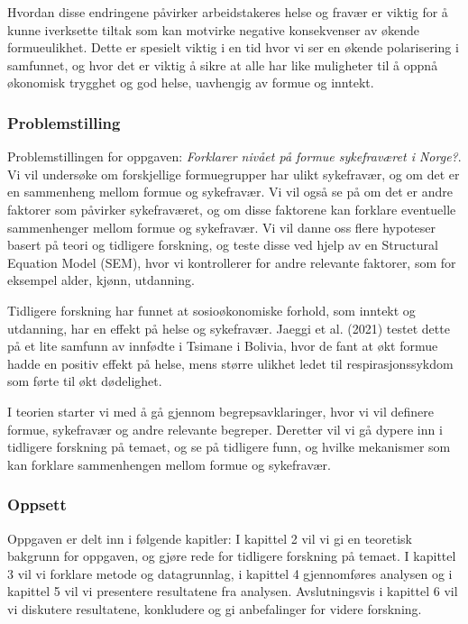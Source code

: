 \documentclass[
  12pt,
  a4paper,
  DIV=11,
  numbers=noendperiod]{scrartcl}
\begin{document}
Hvordan disse endringene påvirker arbeidstakeres helse og fravær er
viktig for å kunne iverksette tiltak som kan motvirke negative
konsekvenser av økende formueulikhet. Dette er spesielt viktig i en tid
hvor vi ser en økende polarisering i samfunnet, og hvor det er viktig å
sikre at alle har like muligheter til å oppnå økonomisk trygghet og god
helse, uavhengig av formue og inntekt.

\subsubsection{Problemstilling}\label{problemstilling}

Problemstillingen for oppgaven: \emph{Forklarer nivået på formue
sykefraværet i Norge?}. Vi vil undersøke om forskjellige formuegrupper
har ulikt sykefravær, og om det er en sammenheng mellom formue og
sykefravær. Vi vil også se på om det er andre faktorer som påvirker
sykefraværet, og om disse faktorene kan forklare eventuelle sammenhenger
mellom formue og sykefravær. Vi vil danne oss flere hypoteser basert på
teori og tidligere forskning, og teste disse ved hjelp av en Structural
Equation Model (SEM), hvor vi kontrollerer for andre relevante faktorer,
som for eksempel alder, kjønn, utdanning.

Tidligere forskning har funnet at sosioøkonomiske forhold, som inntekt
og utdanning, har en effekt på helse og sykefravær. Jaeggi et al. (2021)
testet dette på et lite samfunn av innfødte i Tsimane i Bolivia, hvor de
fant at økt formue hadde en positiv effekt på helse, mens større ulikhet
ledet til respirasjonssykdom som førte til økt dødelighet.

I teorien starter vi med å gå gjennom begrepsavklaringer, hvor vi vil
definere formue, sykefravær og andre relevante begreper. Deretter vil vi
gå dypere inn i tidligere forskning på temaet, og se på tidligere funn,
og hvilke mekanismer som kan forklare sammenhengen mellom formue og
sykefravær.

\subsubsection{Oppsett}\label{oppsett}

Oppgaven er delt inn i følgende kapitler: I kapittel 2 vil vi gi en
teoretisk bakgrunn for oppgaven, og gjøre rede for tidligere forskning
på temaet. I kapittel 3 vil vi forklare metode og datagrunnlag, i
kapittel 4 gjennomføres analysen og i kapittel 5 vil vi presentere
resultatene fra analysen. Avslutningsvis i kapittel 6 vil vi diskutere
resultatene, konkludere og gi anbefalinger for videre forskning.
\end{document}
